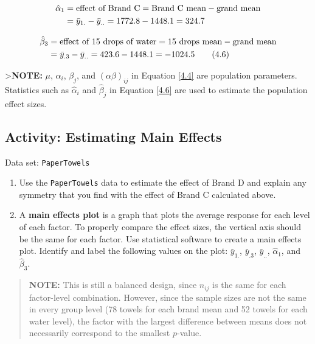 \documentclass[
]{book}
\providecommand{\tightlist}{%
  \setlength{\itemsep}{0pt}\setlength{\parskip}{0pt}}
\begin{document}
\begin{align}
\hat{\alpha}_1 &= \text{effect of Brand C} = \text{Brand C mean} - \text{grand mean} \notag \\
&= \bar{y}_{1.} - \bar{y}_{..} = 1772.8 - 1448.1 = 324.7 \notag
\end{align}

\begin{align}\label{4.6}
\hat{\beta}_3 &= \text{effect of 15 drops of water} = \text{15 drops mean} - \text{grand mean} \notag \\
&= \bar{y}_{.3} - \bar{y}_{..} = 423.6 - 1448.1 = -1024.5 \tag{4.6}
\end{align}

\textgreater{}\textbf{NOTE:} \(\mu\), \(\alpha_i\), \(\beta_j\), and \((\alpha\beta)_{ij}\) in Equation \ref{4.4} are population parameters. Statistics such as \(\hat{\alpha}_i\) and \(\hat{\beta}_j\) in Equation \ref{4.6} are used to estimate the population effect sizes.

\hypertarget{activity-estimating-main-effects}{%
\subsection*{Activity: Estimating Main Effects}\label{activity-estimating-main-effects}}

Data set: \texttt{PaperTowels}

\begin{enumerate}
\def\labelenumi{\arabic{enumi}.}
\setcounter{enumi}{23}
\tightlist
\item
  Use the \texttt{PaperTowels} data to estimate the effect of Brand D and explain any symmetry that you find with the effect of Brand C calculated above.
\item
  A \textbf{main effects plot} is a graph that plots the average response for each level of each factor. To properly compare the effect sizes, the vertical axis should be the same for each factor. Use statistical software to create a main effects plot. Identify and label the following values on the plot: \(\bar{y}_{1.}\), \(\bar{y}_{.3}\), \(\bar{y}_{..}\), \(\hat{\alpha}_1\), and \(\hat{\beta}_3\).
\end{enumerate}

\begin{quote}
\textbf{NOTE:} This is still a balanced design, since \(n_{ij}\) is the same for each factor-level combination. However, since the sample sizes are not the same in every group level (78 towels for each brand mean and 52 towels for each water level), the factor with the largest difference between means does not necessarily correspond to the smallest \(p\)-value.
\end{quote}
\end{document}

